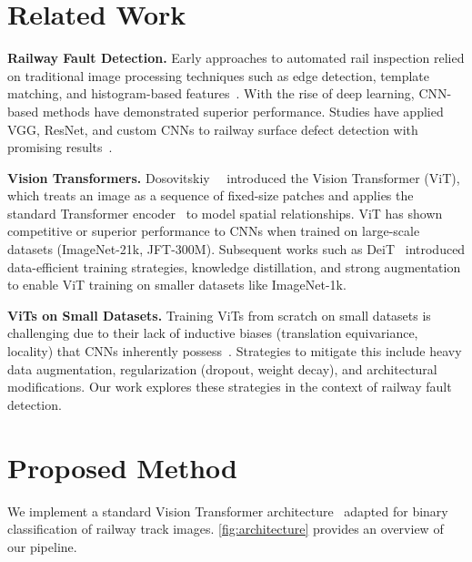 \documentclass[10pt,twocolumn,letterpaper]{article}
\begin{document}
\section{Related Work}
\label{sec:related}

\textbf{Railway Fault Detection.} Early approaches to automated rail inspection relied on traditional image processing techniques such as edge detection, template matching, and histogram-based features~\cite{mandriota2004filter}. With the rise of deep learning, CNN-based methods have demonstrated superior performance. Studies have applied VGG, ResNet, and custom CNNs to railway surface defect detection with promising results~\cite{gibert2017deep, faghih2019deep}.

\textbf{Vision Transformers.} Dosovitskiy~\etal~\cite{dosovitskiy2020image} introduced the Vision Transformer (ViT), which treats an image as a sequence of fixed-size patches and applies the standard Transformer encoder~\cite{vaswani2017attention} to model spatial relationships. ViT has shown competitive or superior performance to CNNs when trained on large-scale datasets (ImageNet-21k, JFT-300M). Subsequent works such as DeiT~\cite{touvron2021training} introduced data-efficient training strategies, knowledge distillation, and strong augmentation to enable ViT training on smaller datasets like ImageNet-1k.

\textbf{ViTs on Small Datasets.} Training ViTs from scratch on small datasets is challenging due to their lack of inductive biases (translation equivariance, locality) that CNNs inherently possess~\cite{dosovitskiy2020image}. Strategies to mitigate this include heavy data augmentation, regularization (dropout, weight decay), and architectural modifications. Our work explores these strategies in the context of railway fault detection.

\section{Proposed Method}
\label{sec:method}

We implement a standard Vision Transformer architecture~\cite{dosovitskiy2020image} adapted for binary classification of railway track images. \cref{fig:architecture} provides an overview of our pipeline.
\end{document}
